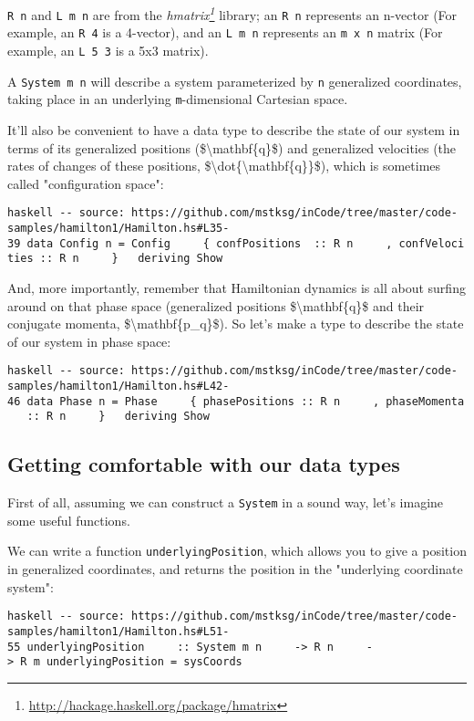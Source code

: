 \documentclass[]{article}
\renewcommand{\href}[2]{#2\footnote{\url{#1}}}
\begin{document}
\texttt{R\ n} and \texttt{L\ m\ n} are from the
\emph{\href{http://hackage.haskell.org/package/hmatrix}{hmatrix}} library; an
\texttt{R\ n} represents an n-vector (For example, an \texttt{R\ 4} is a
4-vector), and an \texttt{L\ m\ n} represents an \texttt{m\ x\ n} matrix (For
example, an \texttt{L\ 5\ 3} is a 5x3 matrix).

A \texttt{System\ m\ n} will describe a system parameterized by \texttt{n}
generalized coordinates, taking place in an underlying \texttt{m}-dimensional
Cartesian space.

It'll also be convenient to have a data type to describe the state of our system
in terms of its generalized positions (\$\textbackslash{}mathbf\{q\}\$) and
generalized velocities (the rates of changes of these positions,
\$\textbackslash{}dot\{\textbackslash{}mathbf\{q\}\}\$), which is sometimes
called "configuration space":

\texttt{haskell\ -\/-\ source:\ https://github.com/mstksg/inCode/tree/master/code-samples/hamilton1/Hamilton.hs\#L35-39\ data\ Config\ n\ =\ Config\ \ \ \ \ \{\ confPositions\ \ ::\ R\ n\ \ \ \ \ ,\ confVelocities\ ::\ R\ n\ \ \ \ \ \}\ \ \ deriving\ Show}

And, more importantly, remember that Hamiltonian dynamics is all about surfing
around on that phase space (generalized positions
\$\textbackslash{}mathbf\{q\}\$ and their conjugate momenta,
\$\textbackslash{}mathbf\{p\_q\}\$). So let's make a type to describe the state
of our system in phase space:

\texttt{haskell\ -\/-\ source:\ https://github.com/mstksg/inCode/tree/master/code-samples/hamilton1/Hamilton.hs\#L42-46\ data\ Phase\ n\ =\ Phase\ \ \ \ \ \{\ phasePositions\ ::\ R\ n\ \ \ \ \ ,\ phaseMomenta\ \ \ ::\ R\ n\ \ \ \ \ \}\ \ \ deriving\ Show}

\subsection{Getting comfortable with our data types}

First of all, assuming we can construct a \texttt{System} in a sound way, let's
imagine some useful functions.

We can write a function \texttt{underlyingPosition}, which allows you to give a
position in generalized coordinates, and returns the position in the "underlying
coordinate system":

\texttt{haskell\ -\/-\ source:\ https://github.com/mstksg/inCode/tree/master/code-samples/hamilton1/Hamilton.hs\#L51-55\ underlyingPosition\ \ \ \ \ ::\ System\ m\ n\ \ \ \ \ -\textgreater{}\ R\ n\ \ \ \ \ -\textgreater{}\ R\ m\ underlyingPosition\ =\ sysCoords}
\end{document}
